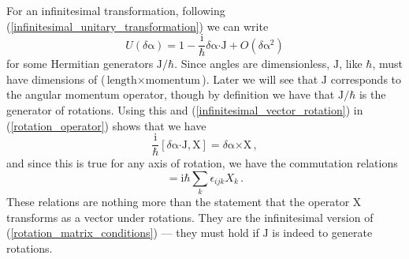 \documentclass{article}
\theoremstyle{plain}\theoremheaderfont{\normalfont\itshape}\theorembodyfont{\rmfamily}\theoremseparator{.}\newtheorem*{rem}{Remark}\newtheorem*{ex}{Example}\newtheorem*{proof}{Proof}\newtheorem*{altp}{Alternative proof}
\theoremstyle{plain}\theoremheaderfont{\normalfont\bfseries}\theorembodyfont{\rmfamily}\theoremseparator{.}\newtheorem{thm}{Theorem}[section]\newtheorem{lem}[thm]{Lemma}\newtheorem{prop}[thm]{Proposition}\newtheorem*{cor}{Corollary}\newtheorem{defn}[thm]{Definition}\newtheorem{clm}[thm]{Claim}\newtheorem{clminproof}{Claim}
\theoremstyle{break}\theoremheaderfont{\normalfont\itshape}\theorembodyfont{\rmfamily}\theoremseparator{.\medskip}\newtheorem*{proofskip}{Proof}\newtheorem*{exs}{Examples}\newtheorem*{rems}{Remarks}
\theoremstyle{break}\theoremheaderfont{\normalfont\bfseries}\theorembodyfont{\rmfamily}\theoremseparator{.\medskip}\newtheorem{lemskip}[thm]{Lemma}\newtheorem{defnskip}[thm]{Definition}\newtheorem{propskip}[thm]{Proposition}\newtheorem{thmskip}[thm]{Theorem}
\numberwithin{equation}{section}
\newcommand{\ii}{\mathrm{i}}
\newcommand{\vb}[1]{\bm{\mathrm{#1}}}
\newcommand{\cross}{\bm{\times}}
\newcommand{\vdot}{\bm{\cdot}}
\begin{document}
    For an infinitesimal transformation, following (\ref{infinitesimal_unitary_transformation}) we can write
    \begin{equation}\label{infinitesimal_rotation_operator}
        U(\delta\vb{\alpha})=1-\frac{\ii}{\hbar}\delta\vb{\alpha}\vdot\vb{J}+O(\delta\vb{\alpha}^2)
    \end{equation}
    for some Hermitian generators \(\vb{J}/\hbar\). Since angles are dimensionless, \(\vb{J}\), like \(\hbar\), must have dimensions of (\(\text{length}\times\text{momentum}\)). Later we will see that \(\vb{J}\) corresponds to the angular momentum operator, though by definition we have that \(\vb{J}/\hbar\) is the generator of rotations. Using this and (\ref{infinitesimal_vector_rotation}) in (\ref{rotation_operator}) shows that we have
    \begin{equation}
        \frac{\ii}{\hbar}[\delta\vb{\alpha}\vdot\vb{J},\vb{X}]=\delta\vb{\alpha}\cross\vb{X}\,,
    \end{equation}
    and since this is true for any axis of rotation, we have the commutation relations
    \begin{equation}
        [J_i,X_j]=\ii\hbar\sum_{k}\epsilon_{ijk}X_k\,.
    \end{equation}
    These relations are nothing more than the statement that the operator \(\vb{X}\) transforms as a vector under rotations. They are the infinitesimal version of (\ref{rotation_matrix_conditions}) --- they must hold if \(\vb{J}\) is indeed to generate rotations.
\end{document}
